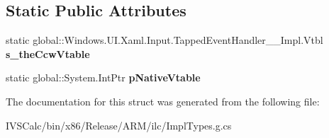 \subsection*{Static Public Attributes}
\begin{DoxyCompactItemize}
\item 
\mbox{\label{struct_windows_1_1_u_i_1_1_xaml_1_1_input_1_1_tapped_event_handler_____impl_1_1_vtbl_aface3ac736d24ef36148f12e1f8b9e49}} 
static global\+::\+Windows.\+U\+I.\+Xaml.\+Input.\+Tapped\+Event\+Handler\+\_\+\+\_\+\+Impl.\+Vtbl {\bfseries s\+\_\+the\+Ccw\+Vtable}
\item 
\mbox{\label{struct_windows_1_1_u_i_1_1_xaml_1_1_input_1_1_tapped_event_handler_____impl_1_1_vtbl_a6c3c8383109c86827fc9ac31b8a64ac9}} 
static global\+::\+System.\+Int\+Ptr {\bfseries p\+Native\+Vtable}
\end{DoxyCompactItemize}


The documentation for this struct was generated from the following file\+:\begin{DoxyCompactItemize}
\item 
I\+V\+S\+Calc/bin/x86/\+Release/\+A\+R\+M/ilc/Impl\+Types.\+g.\+cs\end{DoxyCompactItemize}
